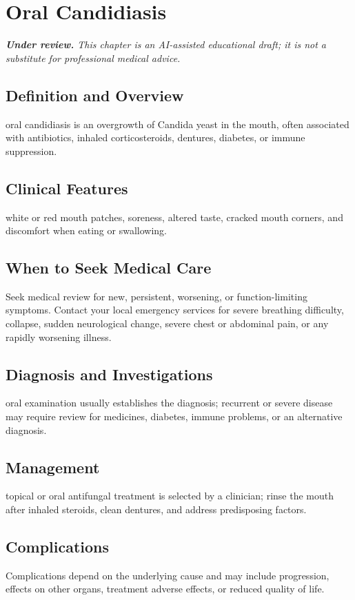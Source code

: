 \chapter{Oral Candidiasis}

\medskip
\noindent\textit{\textbf{Under review.} This chapter is an AI-assisted educational draft; it is not a substitute for professional medical advice.}

\section*{Definition and Overview}
oral candidiasis is an overgrowth of Candida yeast in the mouth, often associated with antibiotics, inhaled corticosteroids, dentures, diabetes, or immune suppression.

\section*{Clinical Features}
white or red mouth patches, soreness, altered taste, cracked mouth corners, and discomfort when eating or swallowing.

\section*{When to Seek Medical Care}
Seek medical review for new, persistent, worsening, or function-limiting symptoms. Contact your local emergency services for severe breathing difficulty, collapse, sudden neurological change, severe chest or abdominal pain, or any rapidly worsening illness.

\section*{Diagnosis and Investigations}
oral examination usually establishes the diagnosis; recurrent or severe disease may require review for medicines, diabetes, immune problems, or an alternative diagnosis.

\section*{Management}
topical or oral antifungal treatment is selected by a clinician; rinse the mouth after inhaled steroids, clean dentures, and address predisposing factors.

\section*{Complications}
Complications depend on the underlying cause and may include progression, effects on other organs, treatment adverse effects, or reduced quality of life.

